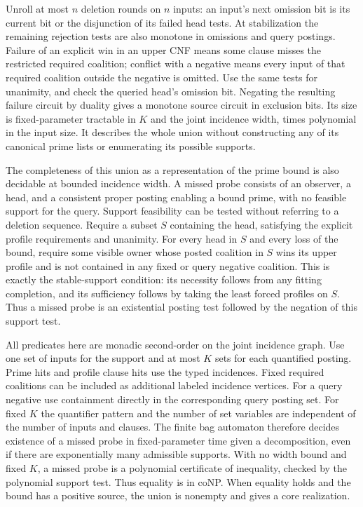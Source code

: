 Unroll at most $n$ deletion rounds on $n$ inputs:
an input's next omission bit is its current bit
or the disjunction of its failed head tests.
At stabilization the remaining rejection tests are
also monotone in omissions and query postings.
Failure of an explicit win in an upper CNF means
some clause misses the restricted required coalition;
conflict with a negative means every input of that
required coalition outside the negative is omitted.
Use the same tests for unanimity, and check the
queried head's omission bit. Negating the resulting
failure circuit by duality gives a monotone source
circuit in exclusion bits. Its size is fixed-parameter
tractable in $K$ and the joint incidence width, times
polynomial in the input size. It describes the whole
union without constructing any of its canonical prime
lists or enumerating its possible supports.

The completeness of this union as a representation of
the prime bound is also decidable at bounded incidence
width. A missed probe consists of an observer, a head,
and a consistent proper posting enabling a bound
prime, with no feasible support for the query.
Support feasibility can be tested without referring
to a deletion sequence. Require a subset $S$ containing
the head, satisfying the explicit profile requirements
and unanimity. For every head in $S$ and every loss
of the bound, require some visible owner whose posted
coalition in $S$ wins its upper profile and is not
contained in any fixed or query negative coalition.
This is exactly the stable-support condition: its
necessity follows from any fitting completion, and its
sufficiency follows by taking the least forced profiles
on $S$. Thus a missed probe is an existential
posting test followed by the negation of this support
test.

All predicates here are monadic second-order on the
joint incidence graph. Use one set of inputs for the
support and at most $K$ sets for each quantified
posting. Prime hits and profile clause hits use the
typed incidences. Fixed required coalitions can be
included as additional labeled incidence vertices.
For a query negative use containment directly in
the corresponding query posting set. For fixed $K$
the quantifier pattern and the number of set variables
are independent of the number of inputs and clauses.
The finite bag automaton therefore decides existence
of a missed probe in fixed-parameter time given a
decomposition, even if there are exponentially many
admissible supports. With no width bound and fixed
$K$, a missed probe is a polynomial certificate of
inequality, checked by the polynomial support test.
Thus equality is in coNP. When equality holds and
the bound has a positive source, the union is nonempty
and gives a core realization.

